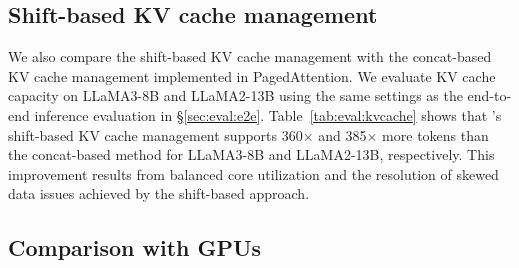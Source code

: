 \vspace{-0.2cm}
\subsection{Shift-based KV cache management}\label{sec:eval:kvcache}
\vspace{-0.2cm}

\begin{table}[t]
  \centering
  \caption{Maximum tokens in generation}
  \label{tab:eval:kvcache}%
\end{table}%


We also compare the shift-based KV cache management with the concat-based KV cache management implemented in PagedAttention. We evaluate KV cache capacity on LLaMA3-8B and LLaMA2-13B using the same settings as the end-to-end inference evaluation in \S\ref{sec:eval:e2e}. Table~\ref{tab:eval:kvcache} shows that \sys’s shift-based KV cache management supports 360$\times$ and 385$\times$ more tokens than the concat-based method for LLaMA3-8B and LLaMA2-13B, respectively. This improvement results from balanced core utilization and the resolution of skewed data issues achieved by the shift-based approach.
\vspace{-0.2cm}
\subsection{Comparison with GPUs}\label{sec:eval:gpu}
\vspace{-0.2cm}

\begin{table}[t]
  \centering
  \caption{Comparing MeshGEMV(WSE-2) with cuBLAS(A100) in GEMV latency and energy.}
  \vspace{-0.3cm}
  \label{tab:mv_gpu}%
\end{table}%


